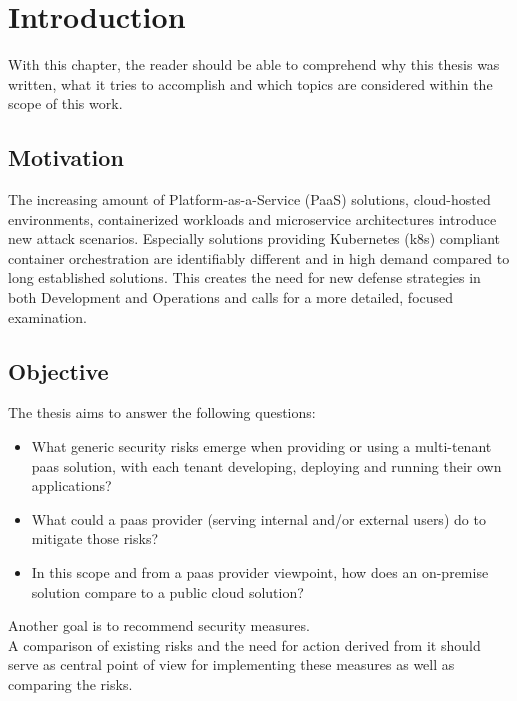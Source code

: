 \chapter{Introduction}
With this chapter, the reader should be able to comprehend why this thesis was written, 
what it tries to accomplish and which topics are considered within the scope of this work.

\section{Motivation}

The increasing amount of Platform-as-a-Service (PaaS) solutions, cloud-hosted environments, containerized workloads and microservice architectures introduce new attack scenarios. 
Especially solutions providing Kubernetes (k8s) compliant container orchestration are identifiably different and in high demand compared to long established solutions. 
This creates the need for new defense strategies in both Development and Operations and calls for a more detailed, focused examination. 

\section{Objective} \label{goal}

The thesis aims to answer the following questions:

\begin{itemize}

\item What generic security risks emerge when providing or using a multi-tenant \gls{paas} solution,
with each tenant developing, deploying and running their own applications? 

\item What could a \gls{paas} provider (serving internal and/or external users) do to mitigate those risks? 

\item  In this scope and from a \gls{paas} provider viewpoint, how does an on-premise solution compare
to a public cloud solution? 

\end{itemize}

Another goal is to recommend security measures. \\
A comparison of existing risks and the need for action derived from it should serve as central point of view for implementing these measures as well as comparing the risks. 


